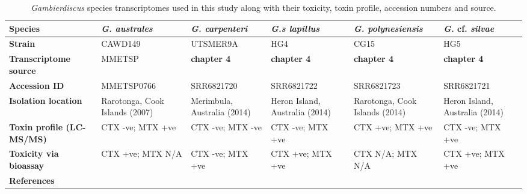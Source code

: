 \documentclass[12pt]{article}
\begin{document}
\FloatBarrier
\begin{table}
\caption{\emph{Gambierdiscus} species transcriptomes used in this study along with their toxicity, toxin profile, accession numbers and source.}
\label{tbl:StrainTable}
\begin{tabular}{ | p{2.5cm} | p{2.3cm} | p{2.3cm} | p{2.3cm} | p{2.3cm} | p{2.3cm}|}
\hline
\textbf{Species}&\textit{G. australes}&\textit{G. carpenteri}&\textit{G.s lapillus}&\textit{G. polynesiensis}&\textit{G.} cf. \textit{silvae}\\
\hline
\textbf{Strain}&CAWD149&UTSMER9A&HG4&CG15&HG5\\
\hline
\textbf{Transcriptome source}&MMETSP&\textbf{chapter 4}&\textbf{chapter 4}&\textbf{chapter 4}&\textbf{chapter 4}\\
\hline
\textbf{Accession ID}&MMETSP0766&SRR6821720&SRR6821722&SRR6821723&SRR6821721\\
\hline
\textbf{Isolation location}&Rarotonga, Cook Islands (2007)&Merimbula, Australia (2014)&Heron Island, Australia (2014)&Rarotonga, Cook Islands (2014)&Heron Island, Australia (2014)\\
\hline
\textbf{Toxin profile (LC-MS/MS)}&CTX -ve; MTX +ve&CTX -ve; MTX -ve&CTX -ve; MTX +ve&CTX +ve; MTX +ve&CTX -ve; MTX +ve\\
\hline
\textbf{Toxicity via bioassay}&CTX +ve; MTX N/A&CTX -ve; MTX +ve&CTX +ve; MTX +ve&CTX N/A; MTX N/A&CTX +ve; MTX +ve\\
\hline
\textbf{References}&\cite{keeling2014marine,rhodes2010toxic,munday2017ciguatoxins}&\cite{larsson2018toxicology}&\cite{larsson2018toxicology,kretzschmar2017characterization}&&\cite{larsson2018toxicology,kretzschmar2017characterization}\\
\hline
\end{tabular}
\end{table}
\FloatBarrier

\end{document}
